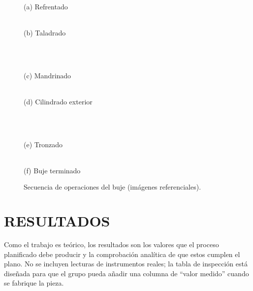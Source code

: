 \documentclass[12pt,a4paper]{article}
\begin{document}
\begin{figure}[H]
	\centering
	\begin{minipage}[t]{0.48\linewidth}\centering
		\\[2pt]
		{\sffamily\scriptsize (a) Refrentado}
	\end{minipage}\hfill
	\begin{minipage}[t]{0.48\linewidth}\centering
		\\[2pt]
		{\sffamily\scriptsize (b) Taladrado}
	\end{minipage}\\[8pt]
	\begin{minipage}[t]{0.48\linewidth}\centering
		\\[2pt]
		{\sffamily\scriptsize (c) Mandrinado}
	\end{minipage}\hfill
	\begin{minipage}[t]{0.48\linewidth}\centering
		\\[2pt]
		{\sffamily\scriptsize (d) Cilindrado exterior}
	\end{minipage}\\[8pt]
	\begin{minipage}[t]{0.48\linewidth}\centering
		\\[2pt]
		{\sffamily\scriptsize (e) Tronzado}
	\end{minipage}\hfill
	\begin{minipage}[t]{0.48\linewidth}\centering
		\\[2pt]
		{\sffamily\scriptsize (f) Buje terminado}
	\end{minipage}
	\caption{Secuencia de operaciones del buje (imágenes
		referenciales).}\label{fig:fotos}
\end{figure}

\newpage

\section{RESULTADOS}

Como el trabajo es teórico, los resultados son los valores que el proceso
planificado debe producir y la comprobación analítica de que estos cumplen el
plano. No se incluyen lecturas de instrumentos reales; la tabla de inspección
está diseñada para que el grupo pueda añadir una columna de ``valor medido''
cuando se fabrique la pieza.
\end{document}

